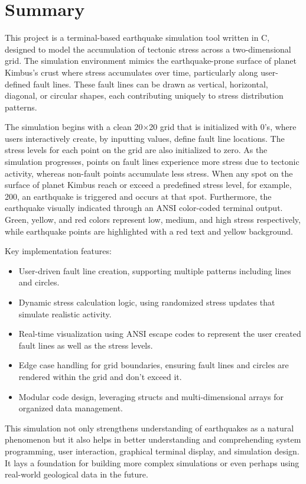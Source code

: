 \documentclass[conference]{IEEEtran}
\begin{document}
\section{Summary}
This project is a terminal-based earthquake simulation tool written in C, designed to model the accumulation of tectonic stress across a two-dimensional grid. The simulation environment mimics the earthquake-prone surface of planet Kimbus's crust where stress accumulates over time, particularly along user-defined fault lines. These fault lines can be drawn as vertical, horizontal, diagonal, or circular shapes, each contributing uniquely to stress distribution patterns.

The simulation begins with a clean 20×20 grid that is initialized with 0's, where users interactively create, by inputting values, define fault line locations. The stress levels for each point on the grid are also initialized to zero. As the simulation progresses, points on fault lines experience more stress due to tectonic activity, whereas non-fault points accumulate less stress. When any spot on the surface of planet Kimbus reach or exceed a predefined stress level, for example, 200, an earthquake is triggered and occurs at that spot. Furthermore, the earthquake visually indicated through an ANSI color-coded terminal output. Green, yellow, and red colors represent low, medium, and high stress respectively, while earthquake points are highlighted with a red text and yellow background.

Key implementation features:
\begin{itemize}
    \item User-driven fault line creation, supporting multiple patterns including lines and circles.
    \item Dynamic stress calculation logic, using randomized stress updates that simulate realistic activity.
    \item Real-time visualization using ANSI escape codes to represent the user created fault lines as well as the stress levels. 
    \item Edge case handling for grid boundaries, ensuring fault lines and circles are rendered within the grid and don't exceed it. 
    \item Modular code design, leveraging structs and multi-dimensional arrays for organized data management.
\end{itemize}

This simulation not only strengthens understanding of earthquakes as a natural phenomenon but it also helps in better understanding and comprehending system programming, user interaction, graphical terminal display, and simulation design. It lays a foundation for building more complex simulations or even perhaps using real-world geological data in the future.
\end{document}
